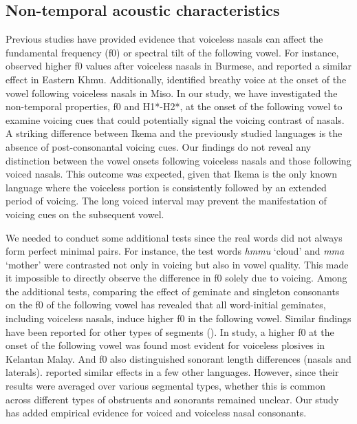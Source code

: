 \documentclass[output=paper]{langscibook}
\begin{document}
\subsection{Non-temporal acoustic characteristics}
\label{sec:shinohara:5.3}
Previous studies have provided evidence that voiceless nasals can affect the fundamental frequency (f0) or spectral tilt of the following vowel. For instance, \citet{Maddieson1984} observed higher f0 values after voiceless nasals in Burmese, and \citet{Kirby2021} reported a similar effect in Eastern Khmu. Additionally, \citet{GogoiEtAl2018} identified breathy voice at the onset of the vowel following voiceless nasals in Miso. In our study, we have investigated the non-temporal properties, f0 and H1*-H2*, at the onset of the following vowel to examine voicing cues that could potentially signal the voicing contrast of nasals. A striking difference between Ikema and the previously studied languages is the absence of post-consonantal voicing cues. Our findings do not reveal any distinction between the vowel onsets following voiceless nasals and those following voiced nasals. This outcome was expected, given that Ikema is the only known language where the voiceless portion is consistently followed by an extended period of voicing. The long voiced interval may prevent the manifestation of voicing cues on the subsequent vowel.

We needed to conduct some additional tests since the real words did not always form perfect minimal pairs. For instance, the test words \textit{hmmu} ‘cloud’ and \textit{mma} ‘mother’ were contrasted not only in voicing but also in vowel quality. This made it impossible to directly observe the difference in f0 solely due to voicing. Among the additional tests, comparing the effect of geminate and singleton consonants on the f0 of the following vowel has revealed that all word-initial geminates, including voiceless nasals, induce higher f0 in the following vowel. Similar findings have been reported for other types of segments (). In  study, a higher f0 at the onset of the following vowel was found most evident for voiceless plosives in Kelantan Malay. And f0 also distinguished sonorant length differences (nasals and laterals). \citet{BurroniEtAl2021} reported similar effects in a few other languages. However, since their results were averaged over various segmental types, whether this is common across different types of obstruents and sonorants remained unclear. Our study has added empirical evidence for voiced and voiceless nasal consonants.
\end{document}
